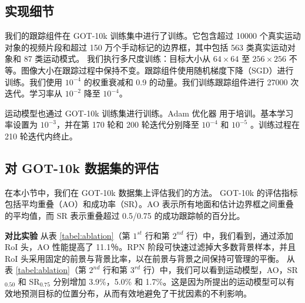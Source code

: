 \subsection{实现细节}
我们的跟踪组件在 GOT-10k \cite{GOT-10k} 训练集中进行了训练。它包含超过 10000 个真实运动对象的视频片段和超过 150 万个手动标记的边界框，其中包括 563 类真实运动对象和 87 类运动模式。
我们执行多尺度训练：目标大小从 $64 \times 64$ 至 $256 \times 256$ 不等。图像大小在跟踪过程中保持不变。跟踪组件使用随机梯度下降（SGD）进行训练。我们使用 $10^{-4}$ 的权重衰减和 0.9 的动量。我们训练跟踪组件进行 27000 次迭代。学习率从 $10^{-2}$ 降至 $10^{-4}$。

运动模型也通过 GOT-10k 训练集进行训练。Adam 优化器 \cite{kingma2014adam} 用于培训。基本学习率设置为 $10^{-3}$，并在第 170 轮和 200 轮迭代分别降至 $10^{-4}$ 和 $10^{-5}$ 。训练过程在 210 轮迭代内终止。

\subsection{对 GOT-10k 数据集的评估}
在本小节中，我们在 GOT-10k \cite{GOT-10k} 数据集上评估我们的方法。
GOT-10k 的评估指标包括平均重叠（AO）和成功率（SR）。AO 表示所有地面和估计边界框之间重叠的平均值，而 SR 表示重叠超过 0.5/0.75 的成功跟踪帧的百分比。

\textbf{对比实验}
从表 \ref{tabel:ablation}（第 $1^{st}$ 行和第 $2^{nd}$ 行）中，我们看到，通过添加 RoI 头，AO 性能提高了 11.1％。RPN 阶段可快速过滤掉大多数背景样本，并且 RoI 头采用固定的前景与背景比率，以在前景与背景之间保持可管理的平衡。
从表 \ref{tabel:ablation}（第 $2^{nd}$ 行和第 $3^{rd}$ 行）中，我们可以看到运动模型，AO，SR$_{0.50}$ 和 SR$_{0.75}$ 分别增加 3.9\%，5.0\% 和 1.7\%。这是因为所提出的运动模型可以有效地预测目标的位置分布，从而有效地避免了干扰因素的不利影响。

